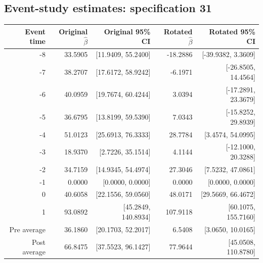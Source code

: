 \documentclass[10pt]{article}
\begin{document}
\subsection*{Event-study estimates: specification 31}
\begin{center}\scriptsize
\begin{tabular}{r rr rr}
\toprule
Event time & Original $\hat\beta$ & Original 95\% CI & Rotated $\hat\beta$ & Rotated 95\% CI \\
\midrule
-8 & 33.5905 & [11.9409, 55.2400] & -18.2886 & [-39.9382, 3.3609] \\
-7 & 38.2707 & [17.6172, 58.9242] & -6.1971 & [-26.8505, 14.4564] \\
-6 & 40.0959 & [19.7674, 60.4244] & 3.0394 & [-17.2891, 23.3679] \\
-5 & 36.6795 & [13.8199, 59.5390] & 7.0343 & [-15.8252, 29.8939] \\
-4 & 51.0123 & [25.6913, 76.3333] & 28.7784 & [3.4574, 54.0995] \\
-3 & 18.9370 & [2.7226, 35.1514] & 4.1144 & [-12.1000, 20.3288] \\
-2 & 34.7159 & [14.9345, 54.4974] & 27.3046 & [7.5232, 47.0861] \\
-1 & 0.0000 & [0.0000, 0.0000] & 0.0000 & [0.0000, 0.0000] \\
0 & 40.6058 & [22.1556, 59.0560] & 48.0171 & [29.5669, 66.4672] \\
1 & 93.0892 & [45.2849, 140.8934] & 107.9118 & [60.1075, 155.7160] \\
\midrule
Pre average & 36.1860 & [20.1703, 52.2017] & 6.5408 & [3.0650, 10.0165] \\
Post average & 66.8475 & [37.5523, 96.1427] & 77.9644 & [45.0508, 110.8780] \\
\bottomrule
\end{tabular}
\end{center}
\clearpage
\end{document}

